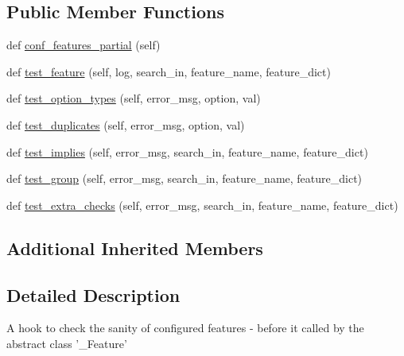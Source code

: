 \subsection*{Public Member Functions}
\begin{DoxyCompactItemize}
\item 
def \hyperlink{classnumpy_1_1distutils_1_1tests_1_1test__ccompiler__opt__conf_1_1__TestConfFeatures_a9c25a03f280b7f4d858b8391fd058d54}{conf\+\_\+features\+\_\+partial} (self)
\item 
def \hyperlink{classnumpy_1_1distutils_1_1tests_1_1test__ccompiler__opt__conf_1_1__TestConfFeatures_abc49709cb8ebb665a34cdd7f5cc5dbb5}{test\+\_\+feature} (self, log, search\+\_\+in, feature\+\_\+name, feature\+\_\+dict)
\item 
def \hyperlink{classnumpy_1_1distutils_1_1tests_1_1test__ccompiler__opt__conf_1_1__TestConfFeatures_a4bbddea3ea592d0aa7912c06c838f9a5}{test\+\_\+option\+\_\+types} (self, error\+\_\+msg, option, val)
\item 
def \hyperlink{classnumpy_1_1distutils_1_1tests_1_1test__ccompiler__opt__conf_1_1__TestConfFeatures_aa87a43537e10b1c8cae68f989de936ee}{test\+\_\+duplicates} (self, error\+\_\+msg, option, val)
\item 
def \hyperlink{classnumpy_1_1distutils_1_1tests_1_1test__ccompiler__opt__conf_1_1__TestConfFeatures_a05bea29ef592436ba7c60ea34dacea08}{test\+\_\+implies} (self, error\+\_\+msg, search\+\_\+in, feature\+\_\+name, feature\+\_\+dict)
\item 
def \hyperlink{classnumpy_1_1distutils_1_1tests_1_1test__ccompiler__opt__conf_1_1__TestConfFeatures_aa1ddc032c198f9430cebfa56924a1214}{test\+\_\+group} (self, error\+\_\+msg, search\+\_\+in, feature\+\_\+name, feature\+\_\+dict)
\item 
def \hyperlink{classnumpy_1_1distutils_1_1tests_1_1test__ccompiler__opt__conf_1_1__TestConfFeatures_a83a909ffca3eab6d4656eb2920901577}{test\+\_\+extra\+\_\+checks} (self, error\+\_\+msg, search\+\_\+in, feature\+\_\+name, feature\+\_\+dict)
\end{DoxyCompactItemize}
\subsection*{Additional Inherited Members}


\subsection{Detailed Description}
\begin{DoxyVerb}A hook to check the sanity of configured features
-   before it called by the abstract class '_Feature'
\end{DoxyVerb}
 

